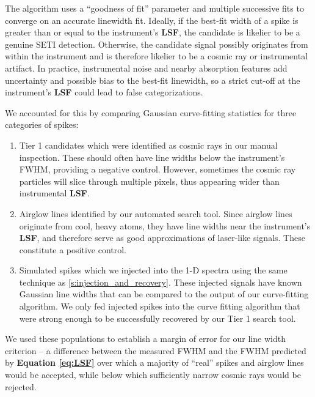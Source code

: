 \documentclass[linenumbers]{aastex701}
\providecommand{\DIFadd}[1]{{\bf #1}} %
\providecommand{\DIFaddbegin}{} %
\providecommand{\DIFaddend}{} %
\begin{document}
The algorithm uses a  \DIFaddbegin \enquote{goodness of fit} \DIFaddend parameter and multiple successive fits to converge on an accurate linewidth fit. Ideally, if the best-fit width of a spike is greater than or equal to the instrument's  \DIFaddbegin \DIFadd{LSF}\DIFaddend , the candidate is likelier to be a genuine SETI detection. Otherwise, the candidate signal possibly originates from within the instrument and is therefore likelier to be a cosmic ray or instrumental artifact. In practice, instrumental noise and nearby absorption features add uncertainty and possible bias to the best-fit linewidth, so a strict cut-off at the instrument's  \DIFaddbegin \DIFadd{LSF }\DIFaddend could lead to false categorizations.

We accounted for this by comparing Gaussian curve-fitting statistics for three categories of spikes: 
\begin{enumerate}
    \item Tier 1 candidates which were identified as cosmic rays in our manual inspection.  These should often have line widths below the instrument's FWHM, providing a negative control.  However, sometimes the cosmic ray particles will slice through multiple pixels, thus appearing wider than instrumental  \DIFaddbegin \DIFadd{LSF}\DIFaddend .
    \item Airglow lines identified by our automated search tool.  Since airglow lines originate from cool, heavy atoms, they have line widths near  the instrument's  \DIFaddbegin \DIFadd{LSF}\DIFaddend , and therefore serve as good approximations of laser-like  signals. These constitute a positive control.
    \item Simulated spikes which we injected into the 1-D spectra using the same technique as \ref{s:injection_and_recovery}.  These injected signals have known Gaussian line widths that can be compared to the output of our curve-fitting algorithm.  We only fed injected spikes into the curve fitting algorithm that were strong enough to be successfully recovered by our Tier 1 search tool. 
\end{enumerate}

We used these populations to establish a margin of error for our line width criterion -- a difference between the measured FWHM and the FWHM predicted by  \DIFaddbegin \DIFadd{Equation \ref{eq:LSF} }\DIFaddend over which a majority of  \DIFaddbegin \enquote{real} \DIFaddend spikes and airglow lines would be accepted, while below which sufficiently narrow cosmic rays would be rejected.
\end{document}
